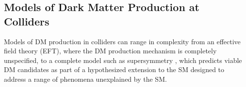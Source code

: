 \documentclass[12pt]{article}
\begin{document}
\subsection{Models of Dark Matter Production at Colliders}
Models of DM production in colliders can range in complexity from an effective field theory (EFT), where the DM production mechanism is completely unspecified, to a complete model such as supersymmetry \cite{susy_dm}, which predicts viable DM candidates as part of a hypothesized extension to the SM designed to address a range of phenomena unexplained by the SM. 

\end{document}
